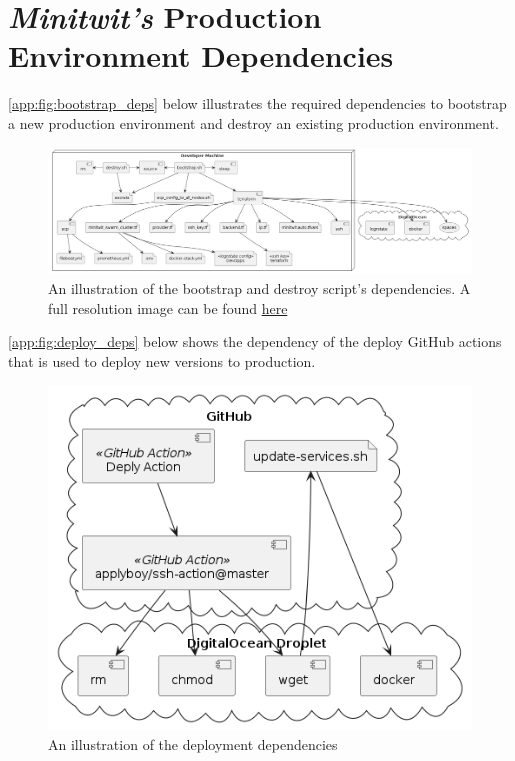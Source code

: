 \section{\textit{Minitwit's} Production Environment Dependencies}
\label{app:prod-deps}

\autoref{app:fig:bootstrap_deps} below illustrates the required dependencies to bootstrap a new production environment and destroy an existing production environment.

\begin{figure}[H]
    \centering
    \includegraphics[width=\textwidth]{images/deps/bootstrap-deps.png}
    \caption{An illustration of the bootstrap and destroy script's dependencies. A full resolution image can be found \href{https://raw.githubusercontent.com/antonPalmFolkmann/DevOps2022/main/report/images/deps/bootstrap-deps.png}{here}}
    \label{app:fig:bootstrap_deps}
\end{figure}

\autoref{app:fig:deploy_deps} below shows the dependency of the deploy GitHub actions that is used to deploy new versions to production.

\begin{figure}[H]
    \centering
    \includegraphics[width=\textwidth]{images/deps/do-deps.png}
    \caption{An illustration of the deployment dependencies}
    \label{app:fig:deploy_deps}
\end{figure}

